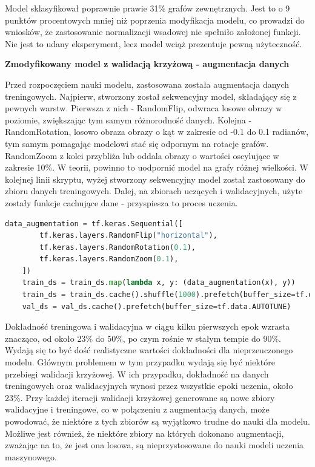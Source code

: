 Model sklasyfikował poprawnie prawie 31\% grafów zewnętrznych.
Jest to o 9 punktów procentowych mniej niż poprzenia modyfikacja modelu,
co prowadzi do wniosków, że zastosowanie normalizacji wsadowej nie spełniło założonej funkcji.
Nie jest to udany eksperyment, lecz model wciąż prezentuje pewną użyteczność.

\textbf{Zmodyfikowany model z walidacją krzyżową - augmentacja danych}

Przed rozpoczęciem nauki modelu, zastosowana została augmentacja danych treningowych.
Najpierw, stworzony został sekwencyjny model, składający się z pewnych warstw.
Pierwsza z nich - RandomFlip, odwraca losowe obrazy w poziomie, zwiększając tym samym różnorodność danych.
Kolejna - RandomRotation, losowo obraza obrazy o kąt w zakresie od -0.1 do 0.1 radianów,
tym samym pomagając modelowi stać się odpornym na rotacje grafów.
RandomZoom z kolei przybliża lub oddala obrazy o wartości oscylujące w zakresie 10\%.
W teorii, powinno to uodpornić model na grafy różnej wielkości.
W kolejnej linii skryptu, wyżej stworzony sekwencyjny model został zastosowany do zbioru danych treningowych.
Dalej, na zbiorach uczących i walidacyjnych, użyte zostały funkcje cachujące dane - przyspiesza to proces uczenia.

\begin{lstlisting}[language=Python,caption=Listing zmodyfikowanego skryptu poprzedzającego tworzenie modelu z walidacją krzyżową
	- wersja 3,label={tests-model-crossval3}]
	data_augmentation = tf.keras.Sequential([
        tf.keras.layers.RandomFlip("horizontal"),
        tf.keras.layers.RandomRotation(0.1),
        tf.keras.layers.RandomZoom(0.1),
    ])
    train_ds = train_ds.map(lambda x, y: (data_augmentation(x), y))
    train_ds = train_ds.cache().shuffle(1000).prefetch(buffer_size=tf.data.AUTOTUNE)
    val_ds = val_ds.cache().prefetch(buffer_size=tf.data.AUTOTUNE)
\end{lstlisting}

Dokładność treningowa i walidacyjna w ciągu kilku pierwszych epok wzrasta znacząco,
od około 23\% do 50\%, po czym rośnie w stałym tempie do 90\%.
Wydają się to być dość realistyczne wartości dokładności dla nieprzeuczonego modelu.
Głównym problemem w tym przypadku wydają się być niektóre przebiegi walidacji krzyżowej.
W ich przypadku, dokładność na danych treningowych oraz walidacyjnych wynosi przez wszystkie epoki uczenia, około 23\%.
Przy każdej iteracji walidacji krzyżowej generowane są nowe zbiory walidacyjne i treningowe,
co w połączeniu z augmentacją danych, może powodować, że niektóre z tych zbiorów są wyjątkowo trudne do nauki dla modelu.
Możliwe jest również, że niektóre zbiory na których dokonano augmentacji, zważając na to, że jest ona losowa,
są nieprzystosowane do nauki modeli uczenia maszynowego.

